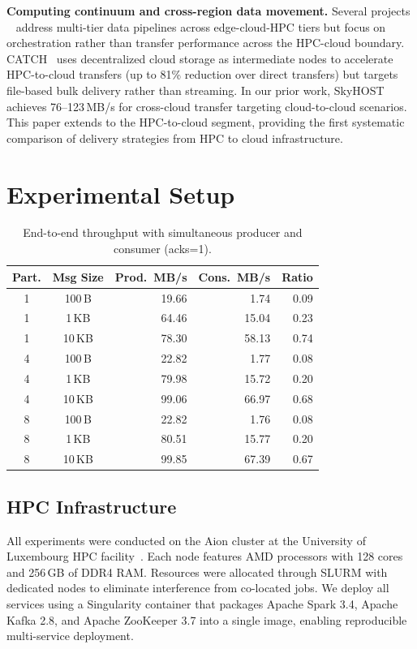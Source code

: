 \documentclass[runningheads]{llncs}
\begin{document}
\textbf{Computing continuum and cross-region data movement.} Several projects ~\cite{extract2023,lclstream2025,datacloud2023} address multi-tier data pipelines across edge-cloud-HPC tiers but focus on orchestration rather than transfer performance across the HPC-cloud boundary. CATCH~\cite{catch} uses decentralized cloud storage as intermediate nodes to accelerate HPC-to-cloud transfers (up to 81\% reduction over direct transfers) but targets file-based bulk delivery rather than streaming. In our prior work, SkyHOST~\cite{tariq2026skyhost} achieves 76--123\,MB/s for cross-cloud transfer targeting cloud-to-cloud scenarios. This paper extends to the HPC-to-cloud segment, providing the first systematic comparison of delivery strategies from HPC to cloud infrastructure.


\section{Experimental Setup}
\label{sec:setup}

\begin{table}[t]
\centering
\caption{End-to-end throughput with simultaneous producer and consumer (acks=1).}
\label{tab:e2e}
\small
\begin{tabular}{@{}ccrrr@{}}
\toprule
\textbf{Part.} & \textbf{Msg Size} & \textbf{Prod.\ MB/s} & \textbf{Cons.\ MB/s} & \textbf{Ratio} \\
\midrule
1 & 100\,B  & 19.66 &  1.74 & 0.09 \\
1 & 1\,KB   & 64.46 & 15.04 & 0.23 \\
1 & 10\,KB  & 78.30 & 58.13 & 0.74 \\
4 & 100\,B  & 22.82 &  1.77 & 0.08 \\
4 & 1\,KB   & 79.98 & 15.72 & 0.20 \\
4 & 10\,KB  & 99.06 & 66.97 & 0.68 \\
8 & 100\,B  & 22.82 &  1.76 & 0.08 \\
8 & 1\,KB   & 80.51 & 15.77 & 0.20 \\
8 & 10\,KB  & 99.85 & 67.39 & 0.67 \\
\bottomrule
\end{tabular}
\end{table}

\subsection{HPC Infrastructure}
All experiments were conducted on the Aion cluster at the University of Luxembourg HPC facility~\cite{varrette2014management}. Each node features AMD processors with 128 cores and 256\,GB of DDR4 RAM. Resources were allocated through SLURM with dedicated nodes to eliminate interference from co-located jobs. We deploy all services using a Singularity container that packages Apache Spark 3.4, Apache Kafka 2.8, and Apache ZooKeeper 3.7 into a single image, enabling reproducible multi-service deployment.
\end{document}
